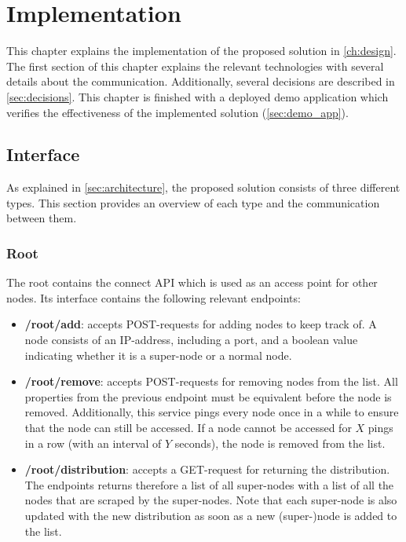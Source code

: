 \chapter{Implementation}\label{ch:implementation}
This chapter explains the implementation of the proposed solution in \autoref{ch:design}. The first section of this chapter explains the relevant technologies with several details about the communication. Additionally, several decisions are described in \autoref{sec:decisions}. This chapter is finished with a deployed demo application which verifies the effectiveness of the implemented solution (\autoref{sec:demo_app}).

\section{Interface} \label{sec:interface}
As explained in \autoref{sec:architecture}, the proposed solution consists of three different types. This section provides an overview of each type and the communication between them.

\subsection{Root} \label{sec:impl-root}
The root contains the connect API which is used as an access point for other nodes. Its interface contains the following relevant endpoints:

\begin{itemize}
    \item \textbf{/root/add}: accepts POST-requests for adding nodes to keep track of. A node consists of an IP-address, including a port, and a boolean value indicating whether it is a super-node or a normal node.
    \item \textbf{/root/remove}: accepts POST-requests for removing nodes from the list. All properties from the previous endpoint must be equivalent before the node is removed. Additionally, this service pings every node once in a while to ensure that the node can still be accessed. If a node cannot be accessed for $X$ pings in a row (with an interval of $Y$ seconds), the node is removed from the list.
    \item \textbf{/root/distribution}: accepts a GET-request for returning the distribution. The endpoints returns therefore a list of all super-nodes with a list of all the nodes that are scraped by the super-nodes. Note that each super-node is also updated with the new distribution as soon as a new (super-)node is added to the list. 
\end{itemize}

